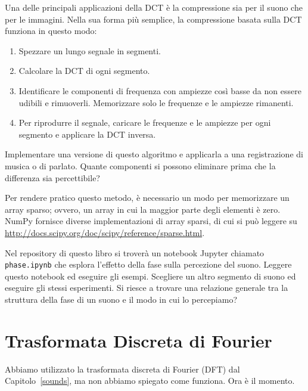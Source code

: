 \documentclass[12pt,a4paper]{book}
\begin{document}
\begin{exercise} Una delle principali applicazioni della DCT è la compressione sia per il suono che per le immagini. Nella sua forma più semplice, la compressione basata sulla DCT funziona in questo modo:

\begin{enumerate} 

\item Spezzare un lungo segnale in segmenti.

\item Calcolare la DCT di ogni segmento.

\item Identificare le componenti di frequenza con ampiezze così basse da non essere udibili e rimuoverli. Memorizzare solo le frequenze e le ampiezze rimanenti.

\item Per riprodurre il segnale, caricare le frequenze e le ampiezze per ogni segmento e applicare la DCT inversa.

\end{enumerate} 

Implementare una versione di questo algoritmo e applicarla a una registrazione di musica o di parlato. Quante componenti si possono eliminare prima che la differenza sia percettibile?

Per rendere pratico questo metodo, è necessario un modo per memorizzare un array sparso; ovvero, un array in cui la maggior parte degli elementi è zero. NumPy fornisce diverse implementazioni di array sparsi, di cui si può leggere su \url{http://docs.scipy.org/doc/scipy/reference/sparse.html}. \end{exercise} 

\begin{exercise} Nel repository di questo libro si troverà un notebook Jupyter chiamato \verb"phase.ipynb" che esplora l'effetto della fase sulla percezione del suono. Leggere questo notebook ed eseguire gli esempi. Scegliere un altro segmento di suono ed eseguire gli stessi esperimenti. Si riesce a trovare una relazione generale tra la struttura della fase di un suono e il modo in cui lo percepiamo? \end{exercise} 

\chapter{Trasformata Discreta di Fourier} \label{dft} 

Abbiamo utilizzato la trasformata discreta di Fourier (DFT) dal Capitolo~\ref{sounds}, ma non abbiamo spiegato come funziona. Ora è il momento.
\end{document}

